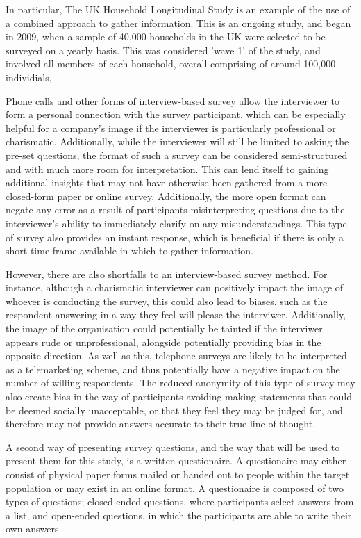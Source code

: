 In particular, The UK Household Longitudinal Study is an example of the use of a combined approach to gather information. 
This is an ongoing study, and began in 2009, when a sample of 40,000 households in the UK were selected to be surveyed on a 
yearly basis. This was considered 'wave 1' of the study, and involved all members of each household, overall comprising of
around 100,000 individials,


Phone calls and other forms of interview-based survey allow the interviewer to form a personal connection with 
the survey participant, which can be especially helpful for a company's image if the interviewer is particularly professional 
or charismatic. Additionally, while the interviewer will still be limited to asking the pre-set questions, the format of such a survey can 
be considered semi-structured and with much more room for interpretation. This can lend itself to gaining additional insights
that may not have otherwise been gathered from a more closed-form paper or online survey. Additionally, the more open format
can negate any error as a result of participants misinterpreting questions due to the interviewer's ability to immediately 
clarify on any misunderstandings. This type of survey also provides an instant response, which is beneficial if there is only 
a short time frame available in which to gather information. 

However, there are also shortfalls to an interview-based survey method. For instance, although a charismatic interviewer can 
positively impact the image of whoever is conducting the survey, this could also lead to biases, such as the respondent 
answering in a way they feel will please the interviwer.
Additionally, the image of the organisation could potentially be tainted if the interviwer appears rude or unprofessional, 
alongside potentially providing bias in the opposite direction. As well as this, telephone surveys are likely to be 
interpreted as a telemarketing scheme, and thus potentially have a negative impact on the number of willing respondents.
The reduced anonymity of this type of survey may also create bias in the way of participants avoiding making statements
that could be deemed socially unacceptable, or that they feel they may be judged for, and therefore may not provide answers
accurate to their true line of thought.

A second way of presenting survey questions, and the way that will be used to present them for this study, is a written questionaire.
A questionaire may either consist of physical paper forms mailed or handed out to people within the target population or may
exist in an online format. A questionaire is composed of two types of questions; closed-ended questions, where participants 
select answers from a list, and open-ended questions, in which the participants are able to write their own answers. 


